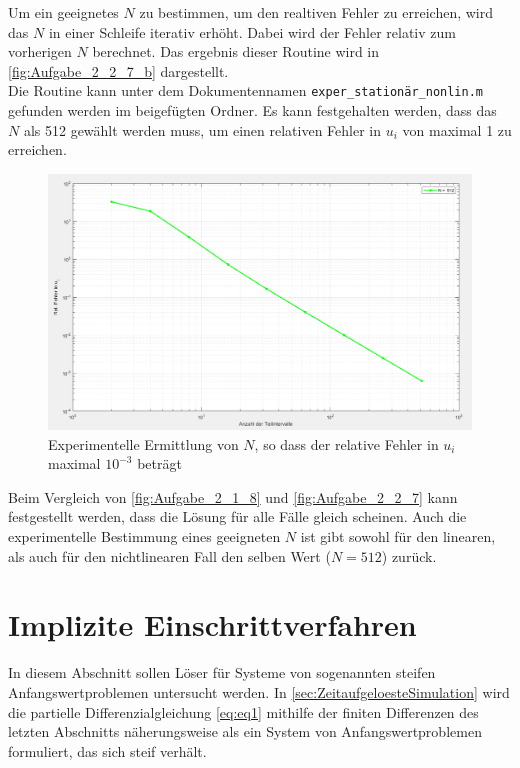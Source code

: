 \documentclass[
	pagesize,
	fontsize=12pt,
	paper=a4,
	oneside,
   reqno
]{scrartcl}
\begin{document}
Um ein geeignetes $N$ zu bestimmen, um den realtiven Fehler zu erreichen, wird das $N$ in einer Schleife iterativ erhöht. Dabei wird der Fehler relativ zum vorherigen $N$ berechnet. Das ergebnis dieser Routine wird in \autoref{fig:Aufgabe_2_2_7_b} dargestellt. \\
Die Routine kann unter dem Dokumentennamen \texttt{exper\_stationär\_nonlin.m} gefunden werden im beigefügten Ordner. Es kann festgehalten werden, dass das $N$ als 512 gewählt werden muss, um einen relativen Fehler in $u_i$ von maximal 1\textperthousand{} zu erreichen.

\begin{figure}[H]
   \centering
   \includegraphics[width=1\textwidth]{Bilder/Aufgabe_2_2_7_b.png}
   \caption[Experimentelle Ermittlung von $N$]{Experimentelle Ermittlung von $N$, so dass der relative Fehler in $u_i$ maximal $10^{-3}$ beträgt}
   \label{fig:Aufgabe_2_2_7_b}
\end{figure}

Beim Vergleich von \autoref{fig:Aufgabe_2_1_8} und \autoref{fig:Aufgabe_2_2_7} kann festgestellt werden, dass die Lösung für alle Fälle gleich scheinen. Auch die experimentelle Bestimmung eines geeigneten $N$ ist gibt sowohl für den linearen, als auch für den nichtlinearen Fall den selben Wert ($N = 512$) zurück.

\clearpage

\section{Implizite Einschrittverfahren} \label{sec:ImpliziteEinschrittverfahren}

In diesem Abschnitt sollen Löser für Systeme von sogenannten steifen Anfangswertproblemen untersucht werden. In \autoref{sec:ZeitaufgeloesteSimulation} wird die partielle Differenzialgleichung \autoref{eq:eq1} mithilfe der finiten Differenzen des letzten Abschnitts näherungsweise als ein System von Anfangswertproblemen formuliert, das sich steif verhält. \\
\end{document}
